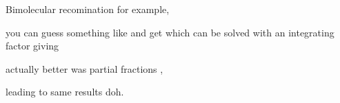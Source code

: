 

Bimolecular recomination for example,


you can guess something like
and get
which can be solved with an integrating factor
giving

actually better was partial fractions ,

leading to same results doh.



